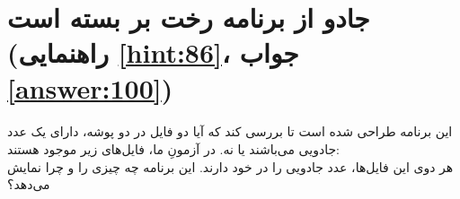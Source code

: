 \section[جادو از برنامه رخت بر بسته است]{جادو از برنامه رخت بر بسته است \protect{} (راهنمایی \ref{hint:86}، جواب \ref{answer:100})}
\paragraph{}\label{prog:56}
این برنامه طراحی شده است تا بررسی کند که آیا دو فایل در دو پوشه، دارای یک عدد جادویی می‌باشند یا نه.
در آزمونِ ما، فایل‌های زیر موجود هستند:
\LTR\noindent
{}\\
\RTL
هر دوی این فایل‌ها، عدد جادویی را در خود دارند. این برنامه چه چیزی را و چرا نمایش می‌دهد؟

